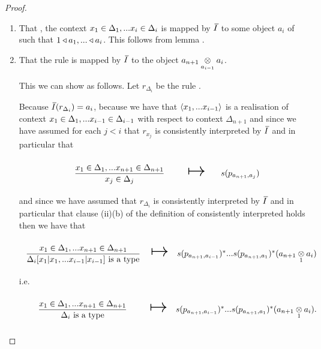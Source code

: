 \begin{proof}
\begin{enumerate}
\item That \foreachi, the context $\xDelta{i}$ is mapped by $\Ibar$ to some object $a_i$ of \catcw such
that $1 \base a_1,...\base a_i$. This follows from lemma . 

\item That the rule  is mapped by $\Ibar$ to the object $\crossx{a_{n+1}}{a_i}{a_{i-1}}$.

This we can show as follows.
\newcommand{\deltaimapped}{\crossx{a_{n+1}}{a_i}{a_{i-1}}}
\newcommand{\deltaimappedlong}{s(p_{a_{n+1},a_{i-1}})^*...s(p_{a_{n+1},a_1})^*(\crossx{a_{n+1}}{a_i}{1})}
Let $r_{\Delta_i}$ be the rule .



Because $\Ibar(r_{\Delta_i}) = a_i$,
because  we have that
$\tuple{x_1,...x_{i-1}}$ is a realisation of context $\xDelta{i-1}$ with respect to context $\Delta_{n+1}$ 
and since we have assumed for each $j<i$ that $r_{x_j}$ is consistently interpreted by $\Ibar$ and in particular
that
\begin{equation*}
\begin{array}{c c c }
\forceSOURCEwidth & & \forceTARGETwidth \\ [-0.1cm]
\gatdisplayrule{\xDelta{n+1}}{\ofT{x_j}{\Delta_j}}  & \Imapsto & s(p_{a_{n+1},a_j}) \\ [0.4cm]
\end{array}
\end{equation*}
and since we have assumed that $r_{\Delta_i}$ is consistently interpreted by $\Ibar$ and in particular that clause (ii)(b) of the definition of consistently interpreted holds
then we have that
\begin{equation*}
\begin{array}{c c c}
\forceSOURCEwidth & & \forceTARGETwidth \\ [-0.1cm]
\gatdisplayrule{\xDelta{n+1}}{\isT{\Delta_i[x_1|x_1,...x_{i-1}|x_{i-1}]}}  & \Imapsto & \deltaimappedlong \\ [0.4cm]
\end{array}
\end{equation*}
i.e.
\begin{equation*}
\begin{array}{c c c}
\forceSOURCEwidth & & \forceTARGETwidth \\ [-0.1cm]
\DDelta{n+1}{i}  & \Imapsto & \deltaimappedlong.\\ [0.4cm]
\end{array}

\end{equation*}
\end{enumerate}
\end{proof}
